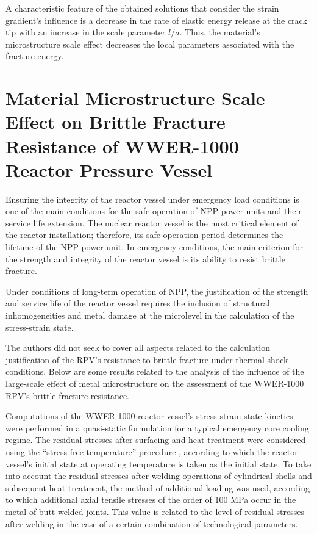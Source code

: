 A characteristic feature of the obtained solutions that consider the strain gradient's influence is a decrease in the rate of elastic energy release at the crack tip with an increase in the scale parameter $l/a$. Thus, the material's microstructure scale effect decreases the local parameters associated with the fracture energy.

\section{Material Microstructure Scale Effect on Brittle Fracture Resistance of WWER-1000 Reactor Pressure Vessel}

Ensuring the integrity of the reactor vessel under emergency load conditions is one of the main conditions for the safe operation of NPP power units and their service life extension. The nuclear reactor vessel is the most critical element of the reactor installation; therefore, its safe operation period determines the lifetime of the NPP power unit. In emergency conditions, the main criterion for the strength and integrity of the reactor vessel is its ability to resist brittle fracture.

Under conditions of long-term operation of NPP, the justification of the strength and service life of the reactor vessel requires the inclusion of structural inhomogeneities and metal damage at the microlevel in the calculation of the stress-strain state.

The authors did not seek to cover all aspects related to the calculation justification of the RPV's resistance to brittle fracture under thermal shock conditions. Below are some results related to the analysis of the influence of the large-scale effect of metal microstructure on the assessment of the WWER-1000 RPV's brittle fracture resistance.

Computations of the WWER-1000 reactor vessel's stress-strain state kinetics were performed in a quasi-static formulation for a typical emergency core cooling regime. The residual stresses after surfacing and heat treatment were considered using the ``stress-free-temperature'' procedure \cite{Chirkov67}, according to which the reactor vessel's initial state at operating temperature is taken as the initial state. To take into account the residual stresses after welding operations of cylindrical shells and subsequent heat treatment, the method of additional loading was used, according to which additional axial tensile stresses of the order of 100 MPa occur in the metal of butt-welded joints. This value is related to the level of residual stresses after welding in the case of a certain combination of technological parameters. 

